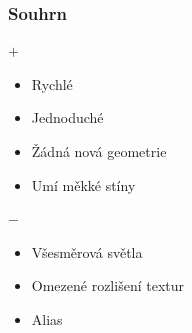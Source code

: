 \begin{frame}
    \frametitle{Souhrn}
    $+$
    \begin{itemize}
        \item Rychlé
        \item Jednoduché
        \item Žádná nová geometrie
        \item Umí měkké stíny
    \end{itemize}
    \vfill
    $-$
    \begin{itemize}
        \item Všesměrová světla
        \item Omezené rozlišení textur
        \item Alias
    \end{itemize}
\end{frame}
